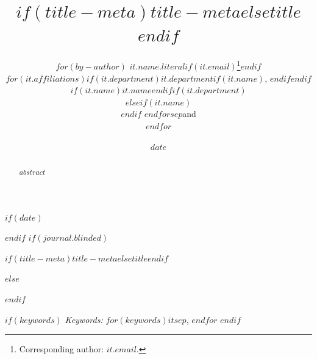 \def\spacingset#1{\renewcommand{\baselinestretch}%
{#1}\small\normalsize} \spacingset{1}

$if(date)$
\date{$date$}
$endif$
$if(journal.blinded)$
\spacingset{.8}
\bigskip
\bigskip
\bigskip
\begin{center}
  {\LARGE\bf $if(title-meta)$$title-meta$$else$$title$$endif$}
\end{center}
\smallskip
\bigskip
\spacingset{1}
$else$
\title{\bf $if(title-meta)$$title-meta$$else$$title$$endif$}
\author{
$for(by-author)$
$it.name.literal$$if(it.email)$\thanks{Corresponding author:
\href{mailto:$it.email$}{$it.email$}.}$endif$\\
$for(it.affiliations)$$if(it.department)$$it.department$$if(it.name)$, $endif$$endif$$if(it.name)$$it.name$$endif$$if(it.department)$\\$elseif(it.name)$\\$endif$
$endfor$$sep$and\\$endfor$}
\maketitle
$endif$

\bigskip
\bigskip
\begin{abstract}
$abstract$
\end{abstract}

$if(keywords)$
\noindent%
{\it Keywords:} $for(keywords)$$it$$sep$, $endfor$
\vfill
$endif$

\newpage
\spacingset{1}
